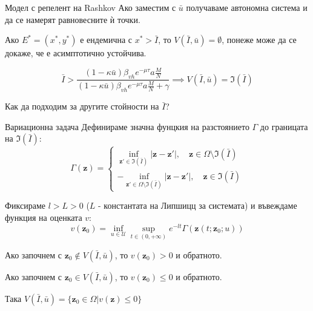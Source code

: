 \begin{frame}[t]{Модел с репелент на Rashkov}
  Ако заместим с $\bar{u}$ получаваме автономна система и да се намерят равновесните ѝ точки.

\begin{proposition}
    Ако $E^* = (x^*, y^*)$ е ендемична с $x^* > \bar{I}$, то $V(\bar{I}, \bar{u}) = \emptyset$, понеже може да се докаже, че е асимптотично устойчива.
  \end{proposition}

  \begin{proposition}
    \begin{equation*}
      \bar{I} > \frac{(1-\kappa \bar{u}) \beta_{vh} e^{-\mu \tau} a \frac{M}{N}}{(1-\kappa \bar{u}) \beta_{vh} e^{-\mu \tau} a \frac{M}{N} + \gamma} \implies V(\bar{I}, \bar{u}) = \mathfrak{I}(\bar{I})
    \end{equation*}
  \end{proposition}
  Как да подходим за другите стойности на $\bar{I}$?
\end{frame}

\begin{frame}[t]{Вариационна задача}
  Дефинираме значна фунцкия на разстоянието $\Gamma$ до границата на $\mathfrak{I}(\bar{I})$:
  \begin{equation}
    \Gamma(\boldsymbol{z}) =
    \begin{cases}
      \inf_{\boldsymbol{z}' \in \mathfrak{I}(\bar{I})} |\boldsymbol{z}-\boldsymbol{z}'|, \quad \boldsymbol{z} \in \Omega \setminus \mathfrak{I}(\bar{I}) \\
      -\inf_{\boldsymbol{z}' \in \Omega \setminus \mathfrak{I}(\bar{I})} |\boldsymbol{z}-\boldsymbol{z}'|, \quad \boldsymbol{z} \in \mathfrak{I}(\bar{I})
    \end{cases}
  \end{equation}

  Фиксираме $l>L>0$ ($L$ - константата на Липшицц за системата) и въвеждаме функция на оценката $v$:
  \begin{equation}
    v(\boldsymbol{z}_0) = \inf_{u \in \mathscr{U}} \sup_{t \in (0, +\infty)} e^{-lt} \Gamma(\boldsymbol{z}(t; \boldsymbol{z}_0; u))
  \end{equation}

  Ако започнем с $\boldsymbol{z}_0 \notin V(\bar{I}, \bar{u})$, то $v(\boldsymbol{z}_0) > 0$ и обратното.

  Ако започнем с $\boldsymbol{z}_0 \in V(\bar{I}, \bar{u})$, то $v(\boldsymbol{z}_0) \leq 0$ и обратното.

  Така $V(\bar{I}, \bar{u}) = \{\boldsymbol{z}_0 \in \Omega \vert v(\boldsymbol{z}) \leq 0\}$
\end{frame}

